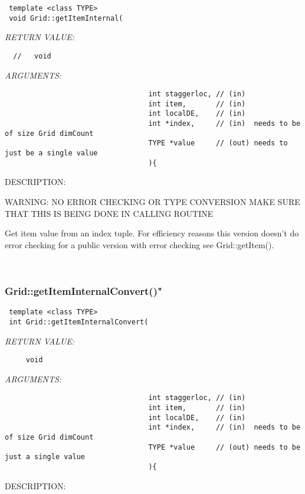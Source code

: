   
\begin{verbatim} template <class TYPE>
 void Grid::getItemInternal(\end{verbatim}{\em RETURN VALUE:}
\begin{verbatim}  //   void\end{verbatim}{\em ARGUMENTS:}
\begin{verbatim}                                  int staggerloc, // (in)
                                  int item,       // (in)
                                  int localDE,    // (in)
                                  int *index,     // (in)  needs to be of size Grid dimCount
                                  TYPE *value     // (out) needs to just be a single value
                                  ){\end{verbatim}
{\sf DESCRIPTION:\\ }


   
    WARNING: NO ERROR CHECKING OR TYPE CONVERSION MAKE SURE THAT THIS IS BEING DONE IN CALLING ROUTINE 
  
    Get item value from an index tuple. For efficiency reasons this version doesn't do error checking
    for a public version with error checking see  Grid::getItem().  
  
   
 
\mbox{}\hrulefill\
 
\subsubsection [Grid::getItemInternalConvert()"] {Grid::getItemInternalConvert()"}


  
\begin{verbatim} template <class TYPE>
 int Grid::getItemInternalConvert(\end{verbatim}{\em RETURN VALUE:}
\begin{verbatim}     void\end{verbatim}{\em ARGUMENTS:}
\begin{verbatim}                                  int staggerloc, // (in)
                                  int item,       // (in)
                                  int localDE,    // (in)
                                  int *index,     // (in)  needs to be of size Grid dimCount
                                  TYPE *value     // (out) needs to be just a single value
                                  ){\end{verbatim}
{\sf DESCRIPTION:\\ }


